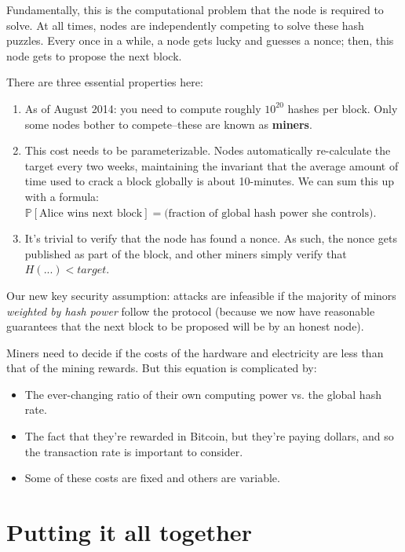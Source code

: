 \documentclass[12pt]{article}
\begin{document}
Fundamentally, this is the computational problem that the node is required to solve. At all times, nodes are independently competing to solve these hash puzzles. Every once in a while, a node gets lucky and guesses a nonce; then, this node gets to propose the next block.

There are three essential properties here:
\begin{enumerate}
\item As of August 2014: you need to compute roughly $10^{20}$ hashes per block. Only some nodes bother to compete--these are known as \textbf{miners}.
\item This cost needs to be parameterizable. Nodes automatically re-calculate the target every two weeks, maintaining the invariant that the average amount of time used to crack a block globally is about 10-minutes. We can sum this up with a formula: $\mathbb{P}[\text{Alice wins next block}] = \text{(fraction of global hash power she controls)}$.
\item It's trivial to verify that the node has found a nonce. As such, the nonce gets published as part of the block, and other miners simply verify that $H(...) < target$.
\end{enumerate}

Our new key security assumption: attacks are infeasible if the majority of minors \textit{weighted by hash power} follow the protocol (because we now have reasonable guarantees that the next block to be proposed will be by an honest node).

Miners need to decide if the costs of the hardware and electricity are less than that of the mining rewards. But this equation is complicated by:
\begin{itemize}
\item The ever-changing ratio of their own computing power vs. the global hash rate.
\item The fact that they're rewarded in Bitcoin, but they're paying dollars, and so the transaction rate is important to consider.
\item Some of these costs are fixed and others are variable.
\end{itemize}

\section*{Putting it all together}
\end{document}
